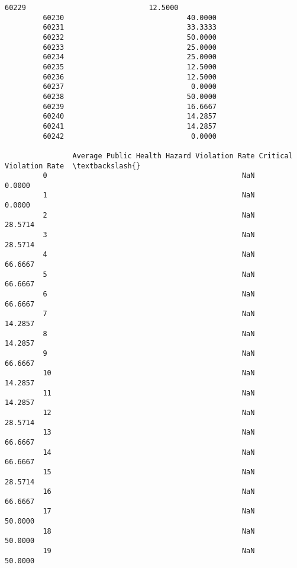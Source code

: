 \documentclass[11pt]{article}
\begin{document}
\begin{Verbatim}[commandchars=\\\{\}]
         60229                             12.5000   
         60230                             40.0000   
         60231                             33.3333   
         60232                             50.0000   
         60233                             25.0000   
         60234                             25.0000   
         60235                             12.5000   
         60236                             12.5000   
         60237                              0.0000   
         60238                             50.0000   
         60239                             16.6667   
         60240                             14.2857   
         60241                             14.2857   
         60242                              0.0000   
         
                Average Public Health Hazard Violation Rate Critical Violation Rate  \textbackslash{}
         0                                              NaN                  0.0000   
         1                                              NaN                  0.0000   
         2                                              NaN                 28.5714   
         3                                              NaN                 28.5714   
         4                                              NaN                 66.6667   
         5                                              NaN                 66.6667   
         6                                              NaN                 66.6667   
         7                                              NaN                 14.2857   
         8                                              NaN                 14.2857   
         9                                              NaN                 66.6667   
         10                                             NaN                 14.2857   
         11                                             NaN                 14.2857   
         12                                             NaN                 28.5714   
         13                                             NaN                 66.6667   
         14                                             NaN                 66.6667   
         15                                             NaN                 28.5714   
         16                                             NaN                 66.6667   
         17                                             NaN                 50.0000   
         18                                             NaN                 50.0000   
         19                                             NaN                 50.0000   

\end{Verbatim}
\end{document}
